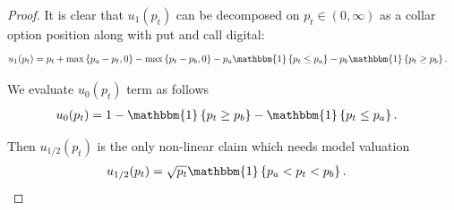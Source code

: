 \documentclass[pdftex,11pt,a4paper] {article}
\begin{document}
\begin{proof}
It is clear that $u_{1}(p_{t})$ can be decomposed on $p_{t}\in(0, \infty)$ as a collar option position along with put and call digital:
\begin{equation} \label{eq:ilf4}
\begin{split}
u_{1}(p_{t}) & =  p_{t} + \max\left\{ p_{a}-p_{t}, 0\right\} - \max\left\{ p_{t}-p_{b}, 0\right\} - p_{a}\mathbbm{1}\left\{p_{t}\leq p_{a}\right\} - p_{b}\mathbbm{1}\left\{p_{t} \geq p_{b}\right\}.
\end{split}
\end{equation}

We evaluate $u_{0}(p_{t})$ term as follows
\begin{equation} \label{eq:ilf5}
\begin{split}
u_{0}(p_{t}) & =  1 - \mathbbm{1}\left\{p_{t} \geq p_{b}\right\} - \mathbbm{1}\left\{p_{t}\leq p_{a}\right\}.
\end{split}
\end{equation}

Then $u_{1/2}(p_{t})$ is the only non-linear claim which needs model valuation
\begin{equation} \label{eq:ilf6}
\begin{split}
u_{1/2}(p_{t}) & =  \sqrt{p_{t}} \mathbbm{1}\left\{ p_{a} < p_{t} < p_{b}\right\}.
\end{split}
\end{equation}


\end{proof}
\end{document}

